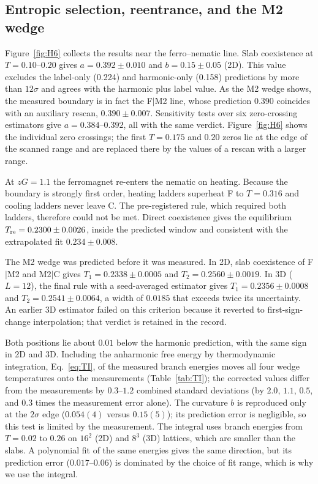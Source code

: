 \documentclass[pre,twocolumn,superscriptaddress,amsmath,amssymb,floatfix]{revtex4-2}
\begin{document}
\subsection{Entropic selection, reentrance, and the M2 wedge}

Figure~\ref{fig:H6} collects the results near the ferro--nematic line. Slab coexistence at $T=0.10$--$0.20$ gives $a=0.392\pm0.010$ and $b=0.15\pm0.05$ (2D). This value excludes the label-only (0.224) and harmonic-only (0.158) predictions by more than $12\sigma$ and agrees with the harmonic plus label value. As the M2 wedge shows, the measured boundary is in fact the F$|$M2 line, whose prediction 0.390 coincides with an auxiliary rescan, $0.390\pm0.007$. Sensitivity tests over six zero-crossing estimators give $a=0.384$--$0.392$, all with the same verdict. Figure~\ref{fig:H6} shows the individual zero crossings; the first $T=0.175$ and $0.20$ zeros lie at the edge of the scanned range and are replaced there by the values of a rescan with a larger range.

At $zG=1.1$ the ferromagnet re-enters the nematic on heating. Because the boundary is strongly first order, heating ladders superheat F to $T=0.316$ and cooling ladders never leave C. The pre-registered rule, which required both ladders, therefore could not be met. Direct coexistence gives the equilibrium $T_{\rm re}=0.2300\pm0.0026$, inside the predicted window and consistent with the extrapolated fit $0.234\pm0.008$.

The M2 wedge was predicted before it was measured. In 2D, slab coexistence of F$|$M2 and M2$|$C gives $T_1=0.2338\pm0.0005$ and $T_2=0.2560\pm0.0019$. In 3D ($L=12$), the final rule with a seed-averaged estimator gives $T_1=0.2356\pm0.0008$ and $T_2=0.2541\pm0.0064$, a width of $0.0185$ that exceeds twice its uncertainty. An earlier 3D estimator failed on this criterion because it reverted to first-sign-change interpolation; that verdict is retained in the record.

Both positions lie about $0.01$ below the harmonic prediction, with the same sign in 2D and 3D. Including the anharmonic free energy by thermodynamic integration, Eq.~\eqref{eq:TI}, of the measured branch energies moves all four wedge temperatures onto the measurements (Table~\ref{tab:TI}); the corrected values differ from the measurements by $0.3$--$1.2$ combined standard deviations (by $2.0$, $1.1$, $0.5$, and $0.3$ times the measurement error alone). The curvature $b$ is reproduced only at the $2\sigma$ edge ($0.054(4)$ versus $0.15(5)$); its prediction error is negligible, so this test is limited by the measurement. The integral uses branch energies from $T=0.02$ to $0.26$ on $16^2$ (2D) and $8^3$ (3D) lattices, which are smaller than the slabs. A polynomial fit of the same energies gives the same direction, but its prediction error ($0.017$--$0.06$) is dominated by the choice of fit range, which is why we use the integral.
\end{document}
